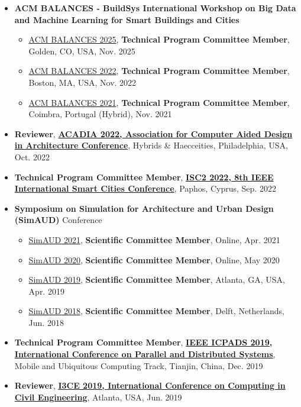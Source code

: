 \documentclass[10pt,a4paper]{article}
\begin{document}
\begin{small}
\begin{itemize}
\item
\textbf{ACM BALANCES - BuildSys International Workshop on Big Data and Machine Learning for Smart Buildings and Cities}
\begin{itemize}
\item \href{https://www.acmbalances.org/}{ACM BALANCES 2025}, \textbf{Technical Program Committee Member}, Golden, CO, USA, Nov. 2025
\item \href{https://www.acmbalances.org/}{ACM BALANCES 2022}, \textbf{Technical Program Committee Member}, Boston, MA, USA, Nov. 2022
\item \href{https://www.acmbalances.org/}{ACM BALANCES 2021}, \textbf{Technical Program Committee Member}, Coimbra, Portugal (Hybrid), Nov. 2021
\end{itemize}

\item \textbf{Reviewer}, \textbf{\href{https://2022.acadia.org/}{ACADIA 2022, Association for Computer Aided Design in Architecture Conference}}, Hybrids \& Haecceities, Philadelphia, USA, Oct. 2022
\item \textbf{Technical Program Committee Member}, \textbf{\href{https://attend.ieee.org/isc2-2022/}{ISC2 2022, 8th IEEE International Smart Cities Conference}}, Paphos, Cyprus, Sep. 2022

\item
\textbf{Symposium on Simulation for Architecture and Urban Design (SimAUD)} Conference
\begin{itemize}
\item \href{http://www.simaud.org/2021/}{SimAUD 2021}, \textbf{Scientific Committee Member}, Online, Apr. 2021
\item \href{http://www.simaud.org/2020/}{SimAUD 2020}, \textbf{Scientific Committee Member}, Online, May 2020
\item \href{http://www.simaud.org/2019/}{SimAUD 2019}, \textbf{Scientific Committee Member}, Atlanta, GA, USA, Apr. 2019
\item \href{http://www.simaud.org/2018/}{SimAUD 2018}, \textbf{Scientific Committee Member}, Delft, Netherlands, Jun. 2018
\end{itemize}


\item \textbf{Technical Program Committee Member}, \textbf{\href{https://www.computer.org/csdl/proceedings/icpads/2019/1h5WjVKWpVu}{IEEE ICPADS 2019, International Conference on Parallel and Distributed Systems}}, Mobile and Ubiquitous Computing Track, Tianjin, China, Dec. 2019
\item \textbf{Reviewer}, \textbf{\href{https://ascelibrary.org/jmenea/international_computing_civil_engineering}{I3CE 2019, International Conference on Computing in Civil Engineering}}, Atlanta, USA, Jun. 2019
\end{itemize}






\end{small}
\end{document}
